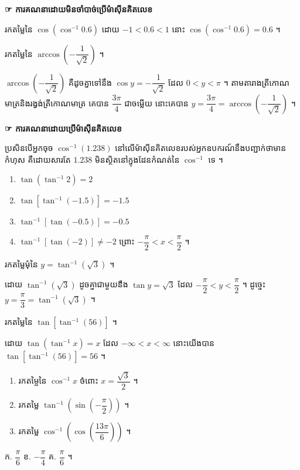 \textbf{\textcolor{blue!60!black}{☞ ការគណនាដោយមិនចាំបាច់ប្រើម៉ាស៊ីនគិតលេខ}}

\begin{example}[ឧទាហរណ៍]
រកតម្លៃនៃ $\cos(\cos^{-1}0.6)$ ដោយ $-1 < 0.6 < 1$ នោះ $\cos(\cos^{-1}0.6) = 0.6$ ។
\end{example}

\begin{example}[លំហាត់គំរូ ៤]
រកតម្លៃនៃ $\arccos\left(-\dfrac{1}{\sqrt{2}}\right)$ ។
\end{example}
\ans
$\arccos\left(-\dfrac{1}{\sqrt{2}}\right)$ គឺដូចគ្នាទៅនឹង $\cos y = -\dfrac{1}{\sqrt{2}}$ ដែល $0 < y < \pi$ ។ តាមតារាងត្រីកោណមាត្រនិងរង្វង់ត្រីកោណមាត្រ គេបាន $\dfrac{3\pi}{4}$ ជាចម្លើយ នោះគេបាន $y = \dfrac{3\pi}{4} = \arccos\left(-\dfrac{1}{\sqrt{2}}\right)$ ។

\textbf{\textcolor{blue!60!black}{☞ ការគណនាដោយប្រើម៉ាស៊ីនគិតលេខ}}

\begin{example}[ឧទាហរណ៍ ៣]
ប្រសិនបើអ្នកចុច $\cos^{-1}(1.238)$ នៅលើម៉ាស៊ីនគិតលេខរបស់អ្នកឧបករណ៍នឹងបញ្ជាក់ថាមានកំហុស គឺដោយសារតែ $1.238$ មិនស្ថិតនៅក្នុងដែនកំណត់នៃ $\cos^{-1}$ ទេ ។
\end{example}

\begin{example}[ឧទាហរណ៍ ៤]
\begin{enumerate}[a]
  \item $\tan(\tan^{-1}2) = 2$
  \item $\tan[\tan^{-1}(-1.5)] = -1.5$
  \item $\tan^{-1}[\tan(-0.5)] = -0.5$
  \item $\tan^{-1}[\tan(-2)] \ne -2$ ព្រោះ $-\dfrac{\pi}{2} < x < \dfrac{\pi}{2}$ ។
\end{enumerate}
\end{example}

\begin{example}[លំហាត់គំរូ ៥]
រកតម្លៃមុំនៃ $y = \tan^{-1}(\sqrt{3})$ ។
\end{example}
\ans
ដោយ $\tan^{-1}(\sqrt{3})$ ដូចគ្នាជាមួយនឹង $\tan y = \sqrt{3}$ ដែល $-\dfrac{\pi}{2} < y < \dfrac{\pi}{2}$ ។ ដូច្នេះ $y = \dfrac{\pi}{3} = \tan^{-1}(\sqrt{3})$ ។

\begin{example}[លំហាត់គំរូ ៦]
រកតម្លៃនៃ $\tan[\tan^{-1}(56)]$ ។
\end{example}
\ans
ដោយ $\tan(\tan^{-1}x) = x$ ដែល $-\infty < x < \infty$ នោះយើងបាន $\tan[\tan^{-1}(56)] = 56$ ។

\begin{pro}
\begin{enumerate}[a]
  \item រកតម្លៃនៃ $\cos^{-1}x$ ចំពោះ $x = \dfrac{\sqrt{3}}{2}$ ។
  \item រកតម្លៃ $\tan^{-1}\left(\sin\left(-\dfrac{\pi}{2}\right)\right)$ ។
  \item រកតម្លៃ $\cos^{-1}\left(\cos\left(\dfrac{13\pi}{6}\right)\right)$ ។
\end{enumerate}
\ans
ក. $\dfrac{\pi}{6}$ \qquad ខ. $-\dfrac{\pi}{4}$ \qquad គ. $\dfrac{\pi}{6}$ ។
\end{pro}

